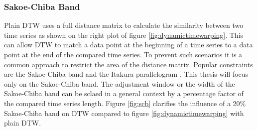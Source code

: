 \subsubsection{Sakoe-Chiba Band} \label{sakoe-chiba_band}
Plain DTW uses a full distance matrix to calculate the similarity between two time series as shown on the right plot of
figure \ref{fig:dynamictimewarping}. This can allow DTW to match a data point at the beginning of a time series to a
data point at the end of the compared time series. To prevent such scenarios it is a common approach to restrict the
area of the distance matrix. Popular constraints are the Sakoe-Chiba band \cite{sakoe1978dynamic} and the Itakura
parallelogram \cite{itakura1975minimum}. This thesis will focus only on the Sakoe-Chiba band. The adjustment window or
the width of the Sakoe-Chiba band can be sclaed in a general context by a percentage factor of the compared time series
length. Figure \ref{fig:scb} clarifies the influence of a 20\% Sakoe-Chiba band on DTW compared to figure
\ref{fig:dynamictimewarping} with plain DTW.

